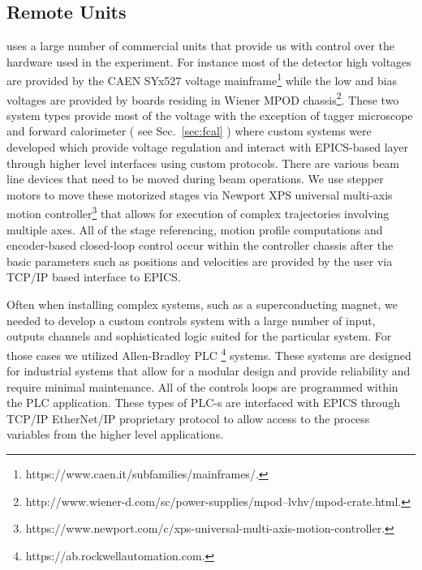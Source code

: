 \subsection{Remote Units \label{sec:controlsinterface}}
\gx{} uses a large number of commercial units that provide us with control over the hardware used in the experiment. For instance most of the detector high voltages are provided by the CAEN SYx527 voltage mainframe\footnote{https://www.caen.it/subfamilies/mainframes/.} while the low and bias voltages are provided by boards residing in Wiener MPOD chassis\footnote{http://www.wiener-d.com/sc/power-supplies/mpod--lvhv/mpod-crate.html.}. These two system  types provide most of the voltage with the exception of tagger microscope and forward calorimeter ( see Sec.~\ref{sec:fcal} ) where custom systems were developed which provide voltage regulation and interact with EPICS-based layer through higher level interfaces using custom protocols.  
There are various beam line devices that need to be moved during beam operations. We use stepper motors to move these motorized stages via Newport XPS universal multi-axis motion controller\footnote{https://www.newport.com/c/xps-universal-multi-axis-motion-controller.} that allows for execution of complex trajectories involving multiple axes. All of the stage referencing, motion profile computations and encoder-based closed-loop control occur within the controller chassis after the basic parameters such as positions and velocities are provided by the user via TCP/IP based interface to EPICS.   

Often when installing complex systems, such as a superconducting magnet, we needed to develop a custom controls system with a large number of input, outputs channels and sophisticated logic suited for the particular system. For those cases we utilized Allen-Bradley PLC \footnote{https://ab.rockwellautomation.com.} systems. These systems are designed for industrial systems that allow for a modular design and provide reliability and require minimal maintenance. All of the controls loops are programmed within the PLC application. These types of PLC-s are interfaced with EPICS through TCP/IP EtherNet/IP proprietary protocol to allow access to the process variables from the higher level applications.  

